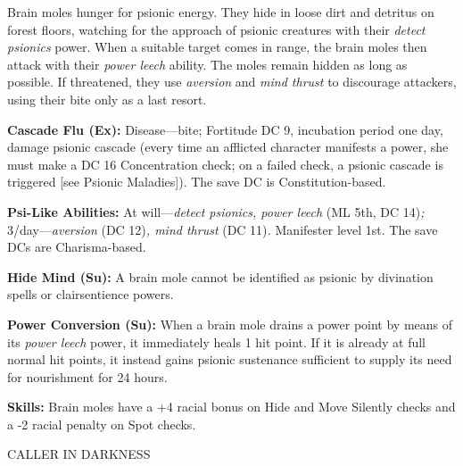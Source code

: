 \documentclass{article}
\begin{document}
Brain moles hunger for psionic energy. They hide in loose dirt and detritus on 
forest floors, watching for the approach of psionic creatures with their \textit{detect 
psionics }power. When a suitable target comes in range, the brain moles then attack 
with their \textit{power leech }ability. The moles remain hidden as long as possible. 
If threatened, they use \textit{aversion }and \textit{mind thrust }to discourage 
attackers, using their bite only as a last resort.

\textbf{Cascade Flu (Ex):} Disease---bite; Fortitude DC 9, incubation period one 
day, damage psionic cascade (every time an afflicted character manifests a power, 
she must make a DC 16 Concentration check; on a failed check, a psionic cascade 
is triggered [see Psionic Maladies]). The save DC is Constitution-based. 

\textbf{Psi-Like Abilities:} At will---\textit{detect psionics, power leech }(ML 
5th, DC 14)\textit{; }3/day---\textit{aversion }(DC 12)\textit{, mind thrust }(DC 
11)\textit{. }Manifester level 1st. The save DCs are Charisma-based. 

\textbf{Hide Mind (Su): }A brain mole cannot be identified as psionic by divination 
spells or clairsentience powers. 

\textbf{Power Conversion (Su):} When a brain mole drains a power point by means 
of its \textit{power leech }power, it immediately heals 1 hit point. If it is already 
at full normal hit points, it instead gains psionic sustenance sufficient to supply 
its need for nourishment for 24 hours. 

\textbf{Skills: }Brain moles have a +4 racial bonus on Hide and Move Silently checks 
and a -2 racial penalty on Spot checks.

\vspace{12pt}
{\LARGE{}CALLER IN DARKNESS}
\end{document}

